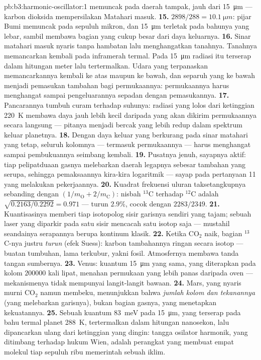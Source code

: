\begin{solution}{pb:b3:harmonic-oscillator:1}
memuncak pada daerah tampak, jauh dari \qty{15}{\micro m} --- karbon
dioksida mempersilakan Matahari masuk.
\textbf{15.} $2898/288 = \qty{10.1}{\micro m}$: pijar Bumi memuncak
pada sepuluh mikron, dan \qty{15}{\micro m} terletak pada bahunya yang
lebar, sambil membawa bagian yang cukup besar dari daya keluarnya.
\textbf{16.} Sinar matahari masuk nyaris tanpa hambatan lalu
menghangatkan tanahnya. Tanahnya memancarkan kembali pada inframerah
termal. Pada \qty{15}{\micro m} radiasi itu terserap dalam hitungan
meter lalu tertermalkan. Udara yang terpanaskan memancarkannya kembali
ke atas maupun ke bawah, dan separuh yang ke bawah menjadi pemasukan
tambahan bagi permukaannya: permukaannya harus menghangat sampai
pengeluarannya sepadan dengan pemasukannya.
\textbf{17.} Pancarannya tumbuh curam terhadap suhunya: radiasi yang
lolos dari ketinggian \qty{220}{K} membawa daya jauh lebih kecil
daripada yang akan dikirim permukaannya secara langsung --- pitanya
menjadi bercak yang lebih redup dalam spektrum keluar planetnya.
\textbf{18.} Dengan daya keluar yang berkurang pada sinar matahari yang
tetap, seluruh kolomnya --- termasuk permukaannya --- harus menghangat
sampai pembukuannya seimbang kembali.
\textbf{19.} Pusatnya jenuh, sayapnya aktif: tiap pelipatduaan gasnya
melebarkan daerah legapnya sebesar tambahan yang serupa, sehingga
pemaksaannya kira-kira logaritmik --- sayap pada pertanyaan 11 yang
melakukan pekerjaannya.
\textbf{20.} Kuadrat frekuensi uluran taksetangkupnya sebanding dengan
$(1/m_{
\text{O}} + 2/m_{\text{C}})$: nisbah $^{13}$C terhadap $^{12}$C
adalah $\sqrt{0.2163/0.2292} = 0.971$ --- turun $2.9\%$, cocok dengan
$2283/2349$.
\textbf{21.} Kuantisasinya memberi tiap isotopolog sisir garisnya
sendiri yang tajam; sebuah laser yang diparkir pada satu sisir mencacah
satu isotop saja --- mustahil seandainya serapannya berupa kontinum
klasik.
\textbf{22.} Ketika CO$_2$ naik, bagian $^{13}$C-nya justru
\emph{turun} (efek Suess): karbon tambahannya ringan secara isotop ---
buatan tumbuhan, lama terkubur, yakni fosil. Atmosfernya membawa tanda
tangan sumbernya.
\textbf{23.} Venus: kuantum \qty{15}{\micro m} yang sama, yang
diterapkan pada kolom $200000$ kali lipat, menahan permukaan yang lebih
panas daripada oven --- mekanismenya tidak mempunyai langit-langit
bawaan.
\textbf{24.} Mars, yang nyaris murni CO$_2$ namun membeku, menunjukkan
bahwa \emph{jumlah kolom dan tekanannya} (yang melebarkan garisnya),
bukan bagian gasnya, yang menetapkan kekuatannya.
\textbf{25.} Sebuah kuantum \qty{83}{meV} pada \qty{15}{\micro m}, yang
terserap pada bahu termal planet \qty{288}{K}, tertermalkan dalam
hitungan nanosekon, lalu dipancarkan ulang dari ketinggian yang dingin:
tangga osilator harmonik, yang ditimbang terhadap hukum Wien, adalah
perangkat yang membuat empat molekul tiap sepuluh ribu memerintah sebuah
iklim.
\end{solution}
